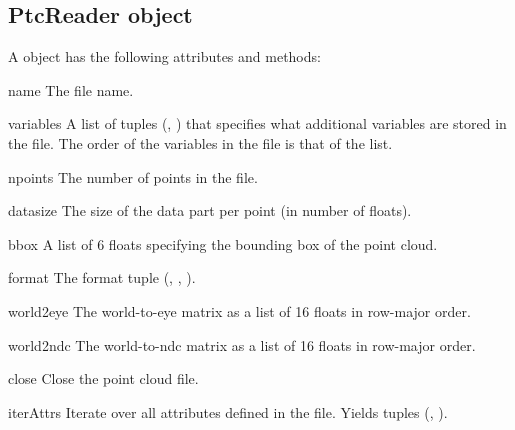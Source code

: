 \subsection{PtcReader object}

A  object has the following attributes and methods:

\begin{memberdesc}{name}
The file name.
\end{memberdesc}

\begin{memberdesc}{variables}
A list of tuples (, ) that specifies what additional
variables are stored in the file. The order of the variables in the file
is that of the list.
\end{memberdesc}

\begin{memberdesc}{npoints}
The number of points in the file.
\end{memberdesc}

\begin{memberdesc}{datasize}
The size of the data part per point (in number of floats).
\end{memberdesc}

\begin{memberdesc}{bbox}
A list of 6 floats specifying the bounding box of the point cloud.
\end{memberdesc}

\begin{memberdesc}{format}
The format tuple (, , ).
\end{memberdesc}

\begin{memberdesc}{world2eye}
The world-to-eye matrix as a list of 16 floats in row-major order.
\end{memberdesc}

\begin{memberdesc}{world2ndc}
The world-to-ndc matrix as a list of 16 floats in row-major order.
\end{memberdesc}

\begin{methoddesc}{close}{}
Close the point cloud file.
\end{methoddesc}

\begin{methoddesc}{iterAttrs}{}
Iterate over all attributes defined in the file. Yields tuples (,
).
\end{methoddesc}

